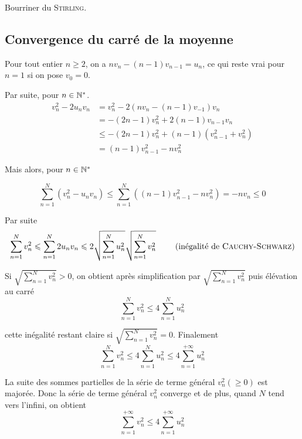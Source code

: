 Bourriner du \textsc{Stirling}.

\subsection{Convergence du carré de la moyenne}

Pour tout entier $n\geqslant 2$, on a $nv_n - (n-1) v_{n-1} = u_n$, ce qui reste vrai pour $n=1$ si on pose $v_0=0$.

Par suite, pour $n\in\mathbb{N}^*$.
\[
    \begin{aligned}
        v^2_n -2u_nv_n &= v_n^2 - 2(nv_n -(n-1)v_{-1})v_n\\
        &= -(2n-1)v_n^2 +2(n-1) v_{n-1}v_n\\
        &\leqslant -(2n-1)v_n^2 +(n-1)(v_{n-1}^2+v_n^2)\\
        &= (n-1) v_{n-1}^2 - nv_n^2
    \end{aligned}
\]

Mais alors, pour $n\in\mathbb{N}^*$

\[
    \sum\limits_{n=1}^N (v_n^2 - u_nv_n) \leqslant \sum\limits_{n=1}^N ((n-1)v_{n-1}^2 - nv_n^2) = -nv_n \leqslant 0
\]

Par suite
\[
    \sum\limits_{n=1}^N v_n^2 \leqslant \sum\limits_{n=1}^N 2u_nv_n \leqslant 2\sqrt{ \sum\limits_{n=1}^N u_n^2 }\sqrt{\sum\limits_{n=1}^N v_n^2  } \text{ \qquad (inégalité de \textsc{Cauchy-Schwarz})} 
\]

Si $\sqrt{\sum\limits_{n=1}^N v_n^2  } > 0$, on obtient après simplification par $\sqrt{\sum\limits_{n=1}^N v_n^2 }$ puis élévation au carré
\[
    \sum\limits_{n=1}^N v_n^2  \leqslant 4 \sum\limits_{n=1}^N u_n^2 
\]

cette inégalité restant claire si $\sqrt{\sum\limits_{n=1}^N v_n^2} = 0$. Finalement
\[
    \sum\limits_{n=1}^N v_n^2  \leqslant 4 \sum\limits_{n=1}^N u_n^2 \leqslant 4 \sum\limits_{n=1}^{+\infty} u_n^2 
\]

La suite des sommes partielles de la série de terme général $v_n^2 (\geqslant 0)$ est majorée. Donc la série de terme général $v_n^2$ converge et de plus, quand $N$ tend vers l'infini, on obtient
\[
    \sum\limits_{n=1}^{+\infty} v_n^2  \leqslant 4 \sum\limits_{n=1}^{+\infty} u_n^2 
\]


